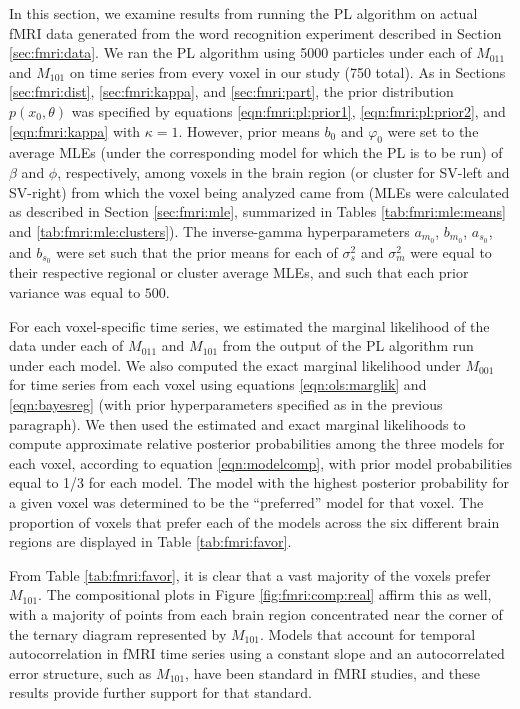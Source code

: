 In this section, we examine results from running the PL algorithm on actual fMRI data generated from the word recognition experiment described in Section \ref{sec:fmri:data}. We ran the PL algorithm using 5000 particles under each of $M_{011}$ and $M_{101}$ on time series from every voxel in our study (750 total). As in Sections \ref{sec:fmri:dist}, \ref{sec:fmri:kappa}, and \ref{sec:fmri:part}, the prior distribution $p(x_0,\theta)$ was specified by equations \eqref{eqn:fmri:pl:prior1}, \eqref{eqn:fmri:pl:prior2}, and \eqref{eqn:fmri:kappa} with $\kappa = 1$. However, prior means $b_0$ and $\varphi_0$ were set to the average MLEs (under the corresponding model for which the PL is to be run) of $\beta$ and $\phi$, respectively, among voxels in the brain region (or cluster for SV-left and SV-right) from which the voxel being analyzed came from (MLEs were calculated as described in Section \ref{sec:fmri:mle}, summarized in Tables \ref{tab:fmri:mle:means} and \ref{tab:fmri:mle:clusters}). The inverse-gamma hyperparameters $a_{m_0}$, $b_{m_0}$, $a_{s_0}$, and $b_{s_0}$ were set such that the prior means for each of $\sigma^2_s$ and $\sigma^2_m$ were equal to their respective regional or cluster average MLEs, and such that each prior variance was equal to $500$.

For each voxel-specific time series, we estimated the marginal likelihood of the data under each of $M_{011}$ and $M_{101}$ from the output of the PL algorithm run under each model. We also computed the exact marginal likelihood under $M_{001}$ for time series from each voxel using equations \eqref{eqn:ols:marglik} and \eqref{eqn:bayesreg} (with prior hyperparameters specified as in the previous paragraph). We then used the estimated and exact marginal likelihoods to compute approximate relative posterior probabilities among the three models for each voxel, according to equation \eqref{eqn:modelcomp}, with prior model probabilities equal to 1/3 for each model. The model with the highest posterior probability for a given voxel was determined to be the ``preferred'' model for that voxel. The proportion of voxels that prefer each of the models across the six different brain regions are displayed in Table \ref{tab:fmri:favor}.

From Table \ref{tab:fmri:favor}, it is clear that a vast majority of the voxels prefer $M_{101}$. The compositional plots in Figure \ref{fig:fmri:comp:real} affirm this as well, with a majority of points from each brain region concentrated near the corner of the ternary diagram represented by $M_{101}$. Models that account for temporal autocorrelation in fMRI time series using a constant slope and an autocorrelated error structure, such as $M_{101}$, have been standard in fMRI studies, and these results provide further support for that standard.

